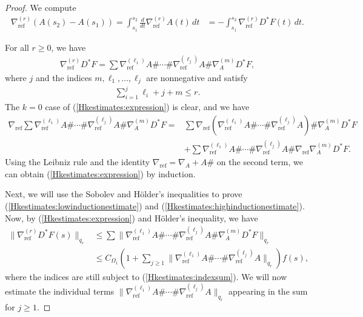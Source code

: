 \documentclass[12pt]{amsart}
\renewcommand{\1}{{\mathbf 1}}
\theoremstyle{others}
\numberwithin{equation}{section}
\begin{document}
\begin{proof}
   We compute
    \begin{align*}
        \nabla_{\text{ref}}^{(r)}(A(s_2) - A(s_1)) = \int_{s_1}^{s_2} \frac{d}{dt} \nabla_{\text{ref}}^{(r)} A(t) \, dt &= -\int_{s_1}^{s_2} \nabla_{\text{ref}}^{(r)} D^\ast F(t)  \,dt.
    \end{align*}  

    For all \(r \geq 0\), we have
    \begin{align}\label{Hkestimates:expression}
        \nabla_{\text{ref}}^{(r)} D^\ast F = \sum \nabla_{\text{ref}}^{(\ell_1)} A \# \cdots \# \nabla_{\text{ref}}^{(\ell_j)} A \# \nabla_A^{(m)} D^\ast F,
    \end{align} where \(j\) and the indices \(m, \ell_1, \dots, \ell_j\) are nonnegative and satisfy 
    \begin{align}\label{Hkestimates:indexsum}
        \sum_{i=1}^j \ell_i + j + m\leq r.
    \end{align}
The \(k = 0\) case of (\ref{Hkestimates:expression}) is clear, and we have
    \begin{align*}
        \nabla_{\text{ref}}\sum \nabla_{\text{ref}}^{(\ell_1)} A \# \cdots \# \nabla_{\text{ref}}^{(\ell_j)} A \# \nabla_A^{(m)} D^\ast F = &\sum \nabla_{\text{ref}} \left( \nabla_{\text{ref}}^{(\ell_1)} A \# \cdots \# \nabla_{\text{ref}}^{(\ell_j)} A \right) \# \nabla_A^{(m)} D^\ast F \\
        &+ \sum \nabla_{\text{ref}}^{(\ell_1)} A \# \cdots \# \nabla_{\text{ref}}^{(\ell_j)} A \# \nabla_{\text{ref}} \nabla_A^{(m)} D^\ast F.
    \end{align*} Using the Leibniz rule and the identity \(\nabla_{\text{ref}} = \nabla_A + A \#\) on the second term, we can obtain (\ref{Hkestimates:expression}) by induction.
    
Next, we will use the Sobolev and H\"older's inequalities to prove (\ref{Hkestimates:lowinductionestimate}) and (\ref{Hkestimates:highinductionestimate}).
      Now, by (\ref{Hkestimates:expression}) and H{\"o}lder's inequality, we have
     \begin{align*}
         \|\nabla_{\text{ref}}^{(r)} D^\ast F(s) \|_{q_r} &\leq \sum \|\nabla_{\text{ref}}^{(\ell_1)} A \# \cdots \# \nabla_{\text{ref}}^{(\ell_j)} A \# \nabla_A^{(m)} D^\ast F\|_{q_r} \\
        &\leq C_{\Omega_1}\left(1 + \sum_{j \geq 1} \|\nabla_{\text{ref}}^{(\ell_1)} A \# \cdots \# \nabla_{\text{ref}}^{(\ell_j)} A\|_{q_r} \right)f(s),
     \end{align*}
     where the indices are still subject to (\ref{Hkestimates:indexsum}).
     We will now estimate the individual terms $\|\nabla_{\text{ref}}^{(\ell_1)} A \# \cdots \# \nabla_{\text{ref}}^{(\ell_j)} A\|_{q_r}$ appearing in the sum for $j \geq 1.$
     

\end{proof}
\end{document}
